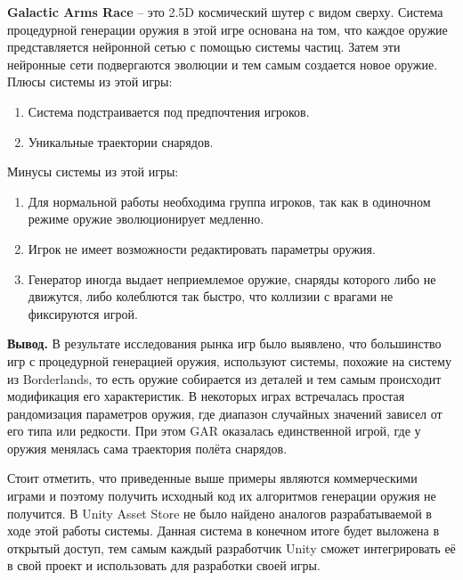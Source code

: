 \textbf{Galactic Arms Race} -- это 2.5D космический шутер с видом сверху. Система процедурной генерации оружия в этой игре основана на том, что каждое оружие представляется нейронной сетью с помощью системы частиц. Затем эти нейронные сети подвергаются эволюции и тем самым создается новое оружие.
%
\\Плюсы системы из этой игры:
\begin{enumerate}[--]
    \item Система подстраивается под предпочтения игроков.
    \item Уникальные траектории снарядов.
\end{enumerate}
%
Минусы системы из этой игры:
\begin{enumerate}[--]
    \item Для нормальной работы необходима группа игроков, так как в одиночном режиме оружие эволюционирует медленно.
    \item Игрок не имеет возможности редактировать параметры оружия.
    \item Генератор иногда выдает неприемлемое оружие, снаряды которого либо не движутся, либо колеблются так быстро, что коллизии с врагами не фиксируются игрой.
\end{enumerate}

\vspace{3mm}

\textbf{Вывод.} В результате исследования рынка игр было выявлено, что большинство игр с процедурной генерацией оружия, используют системы, похожие на систему из Borderlands, то есть оружие собирается из деталей и тем самым происходит модификация его характеристик. В некоторых играх встречалась простая рандомизация параметров оружия, где диапазон случайных значений зависел от его типа или редкости. При этом GAR оказалась единственной игрой, где у оружия менялась сама траектория полёта снарядов.

Стоит отметить, что приведенные выше примеры являются коммерческими играми и поэтому получить исходный код их алгоритмов генерации оружия не получится. В Unity Asset Store не было найдено аналогов разрабатываемой в ходе этой работы системы. Данная система в конечном итоге будет выложена в открытый доступ, тем самым каждый разработчик Unity сможет интегрировать её в свой проект и использовать для разработки своей игры.




